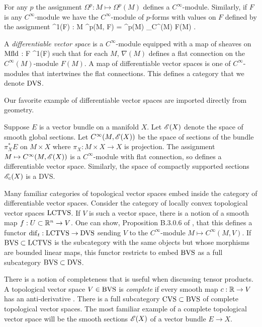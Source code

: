 \documentclass[10pt]{amsart}
\begin{document}
For any $p$ the assignment $\Omega^p : M \mapsto \Omega^p (M)$ defines a $C^\infty$-module.
Similarly, if $F$ is any $C^\infty$-module we have the $C^\infty$-module of $p$-forms with values on $F$ defined by the assignment 
\ben
\Omega^1(F) : M  \mapsto \Omega^p(M, F) = \Omega^p(M) \tensor_{C^\infty(M)} F(M) .
\een

\begin{dfn}
A {\em differentiable vector space} is a $C^\infty$-module equipped with a map of sheaves on ${\rm Mfld}$
\ben
\nabla : F \to \Omega^1(F) 
\een 
such that for each $M$, $\nabla(M)$ defines a flat connection on the $C^\infty(M)$-module $F(M)$. 
A map of differentiable vector spaces is one of $C^\infty$-modules that intertwines the flat connections. 
This defines a category that we denote ${\rm DVS}$.
\end{dfn}

Our favorite example of differentiable vector spaces are imported directly from geometry.

\begin{eg}
Suppose $E$ is a vector bundle on a manifold $X$. 
Let $\mathscr E(X)$ denote the space of smooth global sections.
Let $C^\infty(M, \mathscr E(X))$ be the space of sections of the bundle $\pi_X^*E$ on $M \times X$ where $\pi_X : M \times X \to X$ is projection. 
The assignment $M \mapsto C^\infty(M , \mathscr E(X))$ is a $C^\infty$-module with flat connection, so defines a differentiable vector space.
Similarly, the space of compactly supported sections $\mathscr E_c(X)$ is a DVS. 
\end{eg}

Many familiar categories of topological vector spaces embed inside the category of differentiable vector spaces. 
Consider the category of locally convex topological vector spaces ${\rm LCTVS}$.
If $V$ is such a vector space, there is a notion of a smooth map $f : U \subset \mathbb R^n \to V$.
One can show, Proposition B.3.0.6 of \cite{CG1}, that this defines a functor ${\rm dif}_t : {\rm LCTVS} \to {\rm DVS}$ sending $V$ to the $C^\infty$-module $M \mapsto C^\infty(M, V)$.
If ${\rm BVS} \subset {\rm LCTVS}$ is the subcategory with the same objects but whose morphisms are bounded linear maps, this functor restricts to embed ${\rm BVS}$ as a full subcategory ${\rm BVS} \subset {\rm DVS}$. 

There is a notion of completeness that is useful when discussing tensor products. 
A topological vector space $V \in {\rm BVS}$ is {\em complete} if every smooth map $c : \mathbb R \to V$ has an anti-derivative \cite{KM97}.
There is a full subcategory ${\rm CVS} \subset {\rm BVS}$ of complete topological vector spaces.
The most familiar example of a complete topological vector space will be the smooth sections $\mathscr E(X)$ of a vector bundle $E \to X$.
\end{document}
